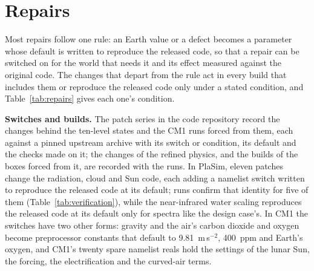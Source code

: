 \section{Repairs}

Most repairs follow one rule: an Earth value or a defect becomes a parameter whose default is written to
reproduce the released code, so that a repair can be switched on for the world that needs it and its effect
measured against the original code. The changes that depart from the rule act in every build that includes
them or reproduce the released code only under a stated condition, and Table~\ref{tab:repairs} gives each
one's condition.

\textbf{Switches and builds.} The patch series in the code
repository record the changes behind the ten-level states and the CM1 runs forced from them, each against a pinned
upstream archive with its switch or condition, its default and the checks made on it; the changes of the refined
physics, and the builds of the boxes forced from it, are recorded with the runs. In PlaSim, eleven patches change the radiation, cloud and Sun code, each adding a namelist switch written
to reproduce the released code at its default; runs confirm that identity for five of them
(Table~\ref{tab:verification}), while the near-infrared water scaling reproduces the released code at its default
only for spectra like the design case's. In CM1 the switches have two other forms: gravity and the air's carbon
dioxide and oxygen become preprocessor constants that default to 9.81~m\,s$^{-2}$, 400~ppm and Earth's oxygen, and
CM1's twenty spare namelist reals hold the settings of the lunar Sun, the forcing, the electrification and the
curved-air terms.


